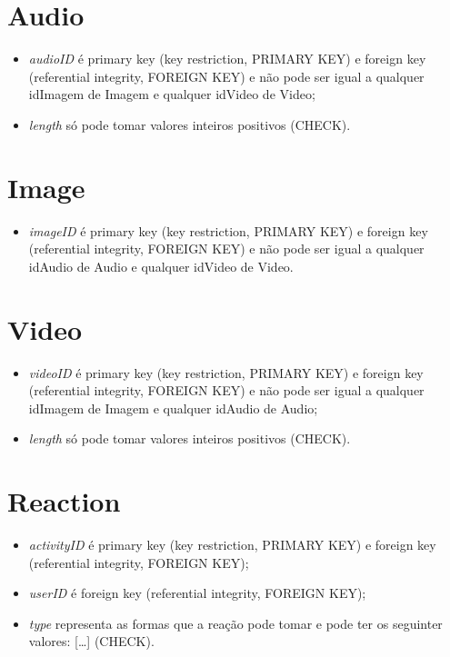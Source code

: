 \documentclass[12pt]{report}
\begin{document}
\section{Audio}

\begin{itemize}
    \item \textit{audioID} é primary key (key restriction, PRIMARY KEY) e foreign key (referential integrity, FOREIGN KEY) e não pode ser igual a qualquer idImagem de Imagem e qualquer idVideo de Video;
    \item \textit{length} só pode tomar valores inteiros positivos (CHECK).
\end{itemize}

\section{Image}

\begin{itemize}
    \item \textit{imageID} é primary key (key restriction, PRIMARY KEY) e foreign key (referential integrity, FOREIGN KEY) e não pode ser igual a qualquer idAudio de Audio e qualquer idVideo de Video.
\end{itemize}

\section{Video}

\begin{itemize}
    \item \textit{videoID} é primary key (key restriction, PRIMARY KEY) e foreign key (referential integrity, FOREIGN KEY) e não pode ser igual a qualquer idImagem de Imagem e qualquer idAudio de Audio;
    \item \textit{length} só pode tomar valores inteiros positivos (CHECK).
\end{itemize}

\section{Reaction}

\begin{itemize}
    \item \textit{activityID} é primary key (key restriction, PRIMARY KEY) e foreign key (referential integrity, FOREIGN KEY);
    \item \textit{userID} é foreign key (referential integrity, FOREIGN KEY);
    \item \textit{type} representa as formas que a reação pode tomar e pode ter os seguinter valores: […] (CHECK).
\end{itemize}
\end{document}

